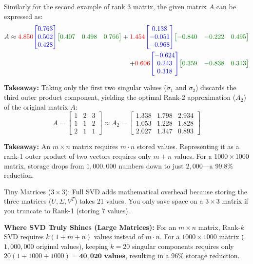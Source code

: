 \documentclass[DIV=20,oneside]{scrartcl}
\newcommand{\takeaway}[1]{%
	\begin{tcolorbox}[
		colback=black!20,
		colframe=black,
		boxrule=0.5pt,
		arc=2mm]
		\textbf{Takeaway: } #1
	\end{tcolorbox}
}
\begin{document}
\begin{itemize}
	Similarly for the second example of rank 3 matrix, the given matrix $A$ can be expressed as:
	 \begin{align*}
	 	A \approx {\color{red}4.850} {\color{blue}\begin{bmatrix} 0.763 \\ 0.502 \\ 0.428 \end{bmatrix}} {\color{green!50!black}\begin{bmatrix} 0.407 & 0.498 & 0.766 \end{bmatrix}} + {\color{red}1.454} {\color{blue}\begin{bmatrix} 0.138 \\ -0.051 \\ -0.968 \end{bmatrix}} {\color{green!50!black}\begin{bmatrix} -0.840 & -0.222 & 0.495 \end{bmatrix}} \\
	 	+ {\color{red}0.606} {\color{blue}\begin{bmatrix} -0.624 \\ 0.243 \\ 0.318 \end{bmatrix}} {\color{green!50!black}\begin{bmatrix} 0.359 & -0.838 & 0.313 \end{bmatrix}}
	 \end{align*}
	\takeaway{Taking only the first two singular values ($\sigma_1$ and $\sigma_2$) discards the third outer product component, yielding the optimal Rank-2 approximation ($A_2$) of the original matrix $A$:
	$$A = \begin{bmatrix} 1 & 2 & 3 \\ 1 & 1 & 2 \\ 2 & 1 & 1 \end{bmatrix} \approx A_2 = \mathbf{\begin{bmatrix} 1.338 & 1.798 & 2.934 \\ 1.053 & 1.228 & 1.828 \\ 2.027 & 1.347 & 0.893 \end{bmatrix}}$$}
	 
	 \takeaway{An $m \times n$ matrix requires $m \cdot n$ stored values. Representing it as a rank-1 outer product of two vectors requires only $m + n$ values. For a $1000 \times 1000$ matrix, storage drops from $1,000,000$ numbers down to just $2,000$—a 99.8$\%$ reduction.
	 \par
	 Tiny Matrices ($3 \times 3$): Full SVD adds mathematical overhead because storing the three matrices ($U, \Sigma, V^T$) takes 21 values. You only save space on a $3 \times 3$ matrix if you truncate to Rank-1 (storing 7 values).
	 \par
	\textbf{ Where SVD Truly Shines (Large Matrices):} For an $m \times n$ matrix, Rank-$k$ SVD requires $k(1 + m + n)$ values instead of $m \cdot n$. For a $1000 \times 1000$ matrix ($1,000,000$ original values), keeping $k = 20$ singular components requires only $20(1 + 1000 + 1000) = \mathbf{40,020\text{ values}}$, resulting in a 96$\%$ storage reduction.}
	 

\end{itemize}
\end{document}
